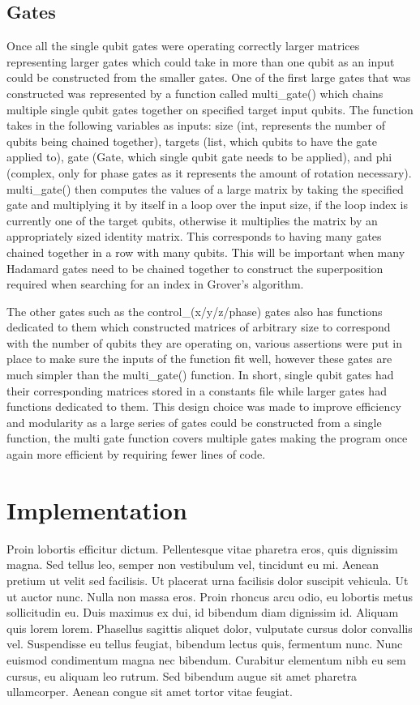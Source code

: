 \documentclass{article}
\begin{document}
\subsection{Gates}
Once all the single qubit gates were operating correctly larger matrices representing larger gates which could take in more than one qubit as an input could be constructed from the smaller gates. One of the first large gates that was constructed was represented by a function called multi\_gate() which chains multiple single qubit gates together on specified target input qubits. The function takes in the following variables as inputs: size (int, represents the number of qubits being chained together), targets (list, which qubits to have the gate applied to), gate (Gate, which single qubit gate needs to be applied), and phi (complex, only for phase gates as it represents the amount of rotation necessary). multi\_gate() then computes the values of a large matrix by taking the specified gate and multiplying it by itself in a loop over the input size, if the loop index is currently one of the target qubits, otherwise it multiplies the matrix by an appropriately sized identity matrix. This corresponds to having many gates chained together in a row with many qubits. This will be important when many Hadamard gates need to be chained together to construct the superposition required when searching for an index in Grover’s algorithm.

The other gates such as the control\_(x/y/z/phase) gates also has functions dedicated to them which constructed matrices of arbitrary size to correspond with the number of qubits they are operating on, various assertions were put in place to make sure the inputs of the function fit well, however these gates are much simpler than the multi\_gate() function. In short, single qubit gates had their corresponding matrices stored in a constants file while larger gates had functions dedicated to them. This design choice was made to improve efficiency and modularity as a large series of gates could be constructed from a single function, the multi gate function covers multiple gates making the program once again more efficient by requiring fewer lines of code.

\section{Implementation}

Proin lobortis efficitur dictum. Pellentesque vitae pharetra eros, quis dignissim magna. Sed tellus leo, semper non vestibulum vel, tincidunt eu mi. Aenean pretium ut velit sed facilisis. Ut placerat urna facilisis dolor suscipit vehicula. Ut ut auctor nunc. Nulla non massa eros. Proin rhoncus arcu odio, eu lobortis metus sollicitudin eu. Duis maximus ex dui, id bibendum diam dignissim id. Aliquam quis lorem lorem. Phasellus sagittis aliquet dolor, vulputate cursus dolor convallis vel. Suspendisse eu tellus feugiat, bibendum lectus quis, fermentum nunc. Nunc euismod condimentum magna nec bibendum. Curabitur elementum nibh eu sem cursus, eu aliquam leo rutrum. Sed bibendum augue sit amet pharetra ullamcorper. Aenean congue sit amet tortor vitae feugiat.
\end{document}
